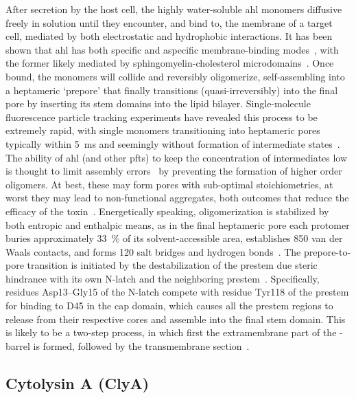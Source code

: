 After secretion by the host cell, the highly water-soluble \gls{ahl} monomers diffusive freely in solution
until they encounter, and bind to, the membrane of a target cell, mediated by both electrostatic and
hydrophobic interactions. It has been shown that \gls{ahl} has both specific and aspecific membrane-binding
modes~\cite{Hildebrand-1991}, with the former likely mediated by sphingomyelin-cholesterol
microdomains~\cite{Valeva-2006}. Once bound, the monomers will collide and reversibly oligomerize,
self-assembling into a heptameric `prepore' that finally transitions (quasi-irreversibly) into the final pore
by inserting its stem domains into the lipid bilayer. Single-molecule fluorescence particle tracking
experiments have revealed this process to be extremely rapid, with single monomers transitioning into
heptameric pores typically within \SI{5}{\ms} and seemingly without formation of intermediate
states~\cite{Thompson-2011}. The ability of \gls{ahl} (and other \glspl{pft}) to keep the concentration of
intermediates low is thought to limit assembly errors~\cite{Lee-2016b} by preventing the formation of higher
order oligomers. At best, these may form pores with sub-optimal stoichiometries, at worst they may lead to
non-functional aggregates, both outcomes that reduce the efficacy of the
toxin~\cite{Fahie-2013,Subburaj-2015}. Energetically speaking, oligomerization is stabilized by both entropic
and enthalpic means, as in the final heptameric pore each protomer buries approximately \SI{33}{\percent} of
its solvent-accessible area, establishes 850 van der Waals contacts, and forms 120 salt bridges and hydrogen
bonds~\cite{Song-1996}. The prepore-to-pore transition is initiated by the destabilization of the prestem due
steric hindrance with its own N-latch and the neighboring prestem~\cite{Sugawara-2015}. Specifically, residues
Asp13--Gly15 of the N-latch compete with residue Tyr118 of the prestem for binding to D45 in the cap domain,
which causes all the prestem regions to release from their respective cores and assemble into the final stem
domain. This is likely to be a two-step process, in which first the extramembrane part of the \tb-barrel is
formed, followed by the transmembrane section~\cite{Sugawara-2015}.



\subsection{Cytolysin A (ClyA)}
%
\label{sec:np:clya}
%

